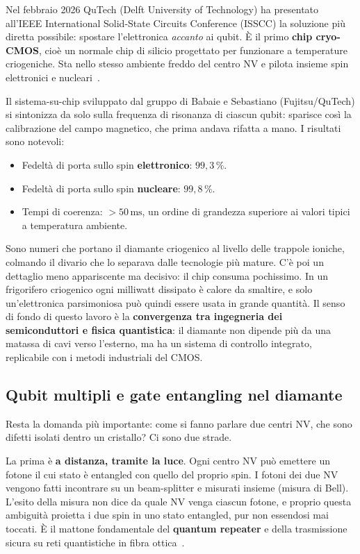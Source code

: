 Nel febbraio 2026 QuTech (Delft University of Technology) ha presentato
all'IEEE International Solid-State Circuits Conference (ISSCC) la soluzione più
diretta possibile: spostare l'elettronica \textit{accanto} ai qubit. È il primo
\textbf{chip cryo-CMOS}, cioè un normale chip di silicio progettato per
funzionare a temperature criogeniche. Sta nello stesso ambiente freddo del
centro NV e pilota insieme spin elettronici e
nucleari~\cite{babaie2026cryogenic}.

Il sistema-su-chip sviluppato dal gruppo di Babaie e Sebastiano (Fujitsu/QuTech)
si sintonizza da solo sulla frequenza di risonanza di ciascun qubit: sparisce
così la calibrazione del campo magnetico, che prima andava rifatta a mano. I
risultati sono notevoli:

\begin{itemize}
  \item Fedeltà di porta sullo spin \textbf{elettronico}: $99{,}3\,\%$.
  \item Fedeltà di porta sullo spin \textbf{nucleare}: $99{,}8\,\%$.
  \item Tempi di coerenza: $> 50\,\text{ms}$, un ordine di grandezza superiore
    ai valori tipici a temperatura ambiente.
\end{itemize}

Sono numeri che portano il diamante criogenico al livello delle trappole
ioniche, colmando il divario che lo separava dalle tecnologie più mature. C'è
poi un dettaglio meno appariscente ma decisivo: il chip consuma pochissimo. In
un frigorifero criogenico ogni milliwatt dissipato è calore da smaltire, e solo
un'elettronica parsimoniosa può quindi essere usata in grande quantità. Il senso
di fondo di questo lavoro è la \textbf{convergenza tra ingegneria dei
semiconduttori e fisica quantistica}: il diamante non dipende più da una matassa
di cavi verso l'esterno, ma ha un sistema di controllo integrato, replicabile
con i metodi industriali del CMOS.

\subsection{Qubit multipli e gate entangling nel diamante}
\label{subsec:nv-multi}

Resta la domanda più importante: come si fanno parlare due centri NV, che sono
difetti isolati dentro un cristallo? Ci sono due strade.

La prima è \textbf{a distanza, tramite la luce}. Ogni centro NV può emettere un
fotone il cui stato è entangled con quello del proprio spin. I fotoni dei due NV
vengono fatti incontrare su un beam-splitter e misurati insieme (misura di
Bell). L'esito della misura non dice da quale NV venga ciascun fotone, e proprio
questa ambiguità proietta i due spin in uno stato entangled, pur non essendosi
mai toccati. È il mattone fondamentale del \textbf{quantum repeater} e della
trasmissione sicura su reti quantistiche in fibra
ottica~\cite{hensen2015loophole}.

